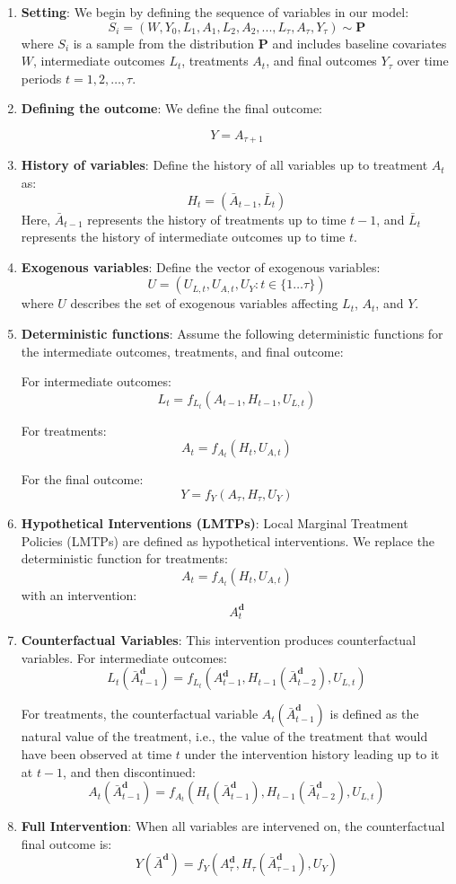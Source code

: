 \documentclass[
  single column]{article}
\begin{document}
\begin{enumerate}
\def\labelenumi{\arabic{enumi}.}
\item
  \textbf{Setting}: We begin by defining the sequence of variables in
  our model: \[
  S_i= (W, Y_0, L_1, A_1, L_2, A_2, ..., L_\tau, A_\tau, Y_{\tau}) \sim \mathbf{P}
  \] where \(S_i\) is a sample from the distribution \(\mathbf{P}\) and
  includes baseline covariates \(W\), intermediate outcomes \(L_t\),
  treatments \(A_t\), and final outcomes \(Y_{\tau}\) over time periods
  \(t = 1, 2, \ldots, \tau\).
\item
  \textbf{Defining the outcome}: We define the final outcome:

  \[
  Y = A_{\tau + 1}
  \]
\item
  \textbf{History of variables}: Define the history of all variables up
  to treatment \(A_t\) as: \[
  H_t = (\bar{A}_{t-1}, \bar{L}_t)
  \] Here, \(\bar{A}_{t-1}\) represents the history of treatments up to
  time \(t-1\), and \(\bar{L}_t\) represents the history of intermediate
  outcomes up to time \(t\).
\item
  \textbf{Exogenous variables}: Define the vector of exogenous
  variables: \[
  U = (U_{L,t}, U_{A,t}, U_{Y}: t \in \{1 \dots \tau\})
  \] where \(U\) describes the set of exogenous variables affecting
  \(L_t\), \(A_t\), and \(Y\).
\item
  \textbf{Deterministic functions}: Assume the following deterministic
  functions for the intermediate outcomes, treatments, and final
  outcome:

  For intermediate outcomes: \[
  L_t = f_{L_t}(A_{t-1}, H_{t-1}, U_{L,t})
  \]

  For treatments: \[
  A_t = f_{A_t}(H_t, U_{A,t})
  \]

  For the final outcome: \[
  Y = f_{Y}(A_{\tau}, H_{\tau}, U_{Y})
  \]
\item
  \textbf{Hypothetical Interventions (LMTPs)}: Local Marginal Treatment
  Policies (LMTPs) are defined as hypothetical interventions. We replace
  the deterministic function for treatments: \[
  A_t = f_{A_t}(H_t, U_{A,t})
  \] with an intervention: \[
  A^\mathbf{d}_t
  \]
\item
  \textbf{Counterfactual Variables}: This intervention produces
  counterfactual variables. For intermediate outcomes: \[
  L_t(\bar{A}^\mathbf{d}_{t-1}) = f_{L_t}(A^\mathbf{d}_{t-1}, H_{t-1}(\bar{A}^\mathbf{d}_{t-2}), U_{L,t})
  \]

  For treatments, the counterfactual variable
  \(A_t(\bar{A}^\mathbf{d}_{t-1})\) is defined as the natural value of
  the treatment, i.e., the value of the treatment that would have been
  observed at time \(t\) under the intervention history leading up to it
  at \(t-1\), and then discontinued: \[
  A_t(\bar{A}^\mathbf{d}_{t-1}) = f_{A_t}(H_t(\bar{A}^\mathbf{d}_{t-1}), H_{t-1}(\bar{A}^\mathbf{d}_{t-2}), U_{L,t})
  \]
\item
  \textbf{Full Intervention}: When all variables are intervened on, the
  counterfactual final outcome is: \[
  Y(\bar{A}^\mathbf{d}) = f_Y(A^\mathbf{d}_\tau, H_\tau(\bar{A}^\mathbf{d}_{\tau-1}), U_{Y})
  \]
\end{enumerate}
\end{document}
